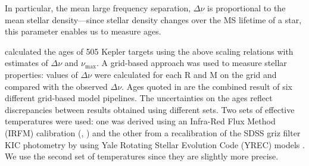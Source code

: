 \documentclass[10pt,preprint]{aastex}
\begin{document}
In particular, the mean large frequency separation, $\Delta\nu$ is proportional to the mean stellar density---since stellar density changes over the MS lifetime of a star, this parameter enables us to measure ages.

\citet{Chaplin2013} calculated the ages of 505 Kepler targets using the above scaling relations with estimates of $\Delta\nu$ and $\nu_{\mathrm{max}}$.
A grid-based approach was used to measure stellar properties: values of $\Delta\nu$ were calculated for each R and M on the grid and compared with the observed $\Delta\nu$.
Ages quoted in \citet{Chaplin2013} are the combined result of six different grid-based model pipelines.
The uncertainties on the ages reflect discrepancies between results obtained using different sets.
Two sets of effective temperatures were used: one was derived using an Infra-Red Flux Method (IRFM) calibration (\citealt{Casagrande2010}, \citealt{SilvaAguirre2012}) and the other from a recalibration of the SDSS griz filter KIC photometry by \citet{Pinsonneault2012} using Yale Rotating Stellar Evolution Code (YREC) models \citep{Demarque2004}.
We use the second set of temperatures since they are slightly more precise.
\end{document}
